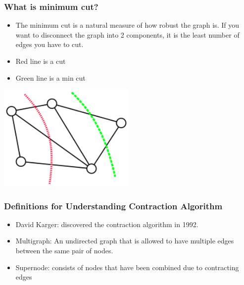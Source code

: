\documentclass{beamer}
\begin{document}
\begin{frame}
\frametitle{What is minimum cut?}
\begin{itemize}
		\item The minimum cut is a natural measure of how robust the graph is. If you want to disconnect the graph into 2 components, it is the least number of edges you have to cut.
		\item Red line is a cut
		\item Green line is a min cut
\end{itemize}
\begin{center}
\includegraphics[width=0.5\textwidth]{min_cut_png_version}
\end{center}

\end{frame}
%

\begin{frame}
\frametitle{Definitions for Understanding Contraction Algorithm}
\begin{itemize}
	\item David Karger: discovered the contraction algorithm in 1992.
	\item Multigraph: An undirected graph that is allowed to have multiple edges between the same pair of nodes.
	\item Supernode: consists of nodes that have been combined due to contracting edges
\end{itemize}
\end{frame}
\end{document}
